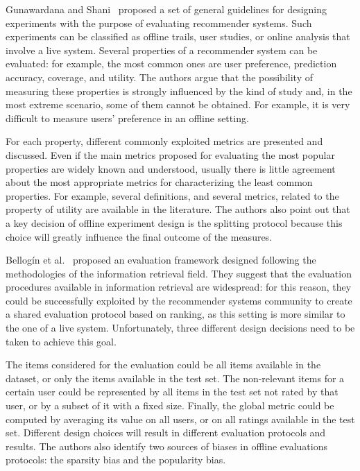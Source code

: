 Gunawardana and Shani~\cite{Gunawardana2015} proposed a set of general guidelines for designing experiments with the purpose of evaluating recommender systems. Such experiments can be classified as offline trails, user studies, or online analysis that involve a live system. Several properties of a recommender system can be evaluated: for example, the most common ones are user preference, prediction accuracy, coverage, and utility. The authors argue that the possibility of measuring these properties is strongly influenced by the kind of study and, in the most extreme scenario, some of them cannot be obtained. For example, it is very difficult to measure users' preference in an offline setting.

For each property, different commonly exploited metrics are presented and discussed. Even if the main metrics proposed for evaluating the most popular properties are widely known and understood, usually there is little agreement about the most appropriate metrics for characterizing the least common properties. For example, several definitions, and several metrics, related to the property of utility are available in the literature. The authors also point out that a key decision of offline experiment design is the splitting protocol because this choice will greatly influence the final outcome of the measures.

Bellog\'in et al.~\cite{Bellogin2017} proposed an evaluation framework designed following the methodologies of the information retrieval field. They suggest that the evaluation procedures available in information retrieval are widespread: for this reason, they could be successfully exploited by the recommender systems community to create a shared evaluation protocol based on ranking, as this setting is more similar to the one of a live system. Unfortunately, three different design decisions need to be taken to achieve this goal.

The items considered for the evaluation could be all items available in the dataset, or only the items available in the test set. The non-relevant items for a certain user could be represented by all items in the test set not rated by that user, or by a subset of it with a fixed size. Finally, the global metric could be computed by averaging its value on all users, or on all ratings available in the test set. Different design choices will result in different evaluation protocols and results. The authors also identify two sources of biases in offline evaluations protocols: the sparsity bias and the popularity bias.

